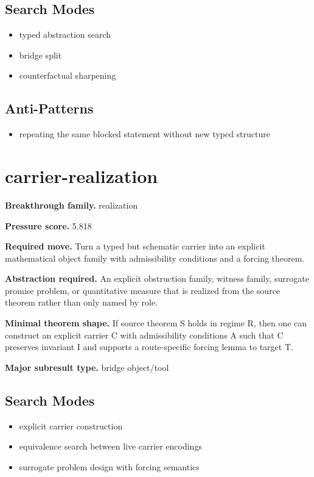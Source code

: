 \documentclass[11pt]{article}
\begin{document}
\subsection*{Search Modes}
\begin{itemize}[leftmargin=*,itemsep=0.2em]
\item typed abstraction search
\item bridge split
\item counterfactual sharpening
\end{itemize}
\subsection*{Anti-Patterns}
\begin{itemize}[leftmargin=*,itemsep=0.2em]
\item repeating the same blocked statement without new typed structure
\end{itemize}
\section{carrier-realization}
\textbf{Breakthrough family.} realization

\textbf{Pressure score.} 5.818

\textbf{Required move.} Turn a typed but schematic carrier into an explicit mathematical object family with admissibility conditions and a forcing theorem.

\textbf{Abstraction required.} An explicit obstruction family, witness family, surrogate promise problem, or quantitative measure that is realized from the source theorem rather than only named by role.

\textbf{Minimal theorem shape.} If source theorem S holds in regime R, then one can construct an explicit carrier C with admissibility conditions A such that C preserves invariant I and supports a route-specific forcing lemma to target T.

\textbf{Major subresult type.} bridge object/tool

\subsection*{Search Modes}
\begin{itemize}[leftmargin=*,itemsep=0.2em]
\item explicit carrier construction
\item equivalence search between live carrier encodings
\item surrogate problem design with forcing semantics
\end{itemize}
\end{document}
